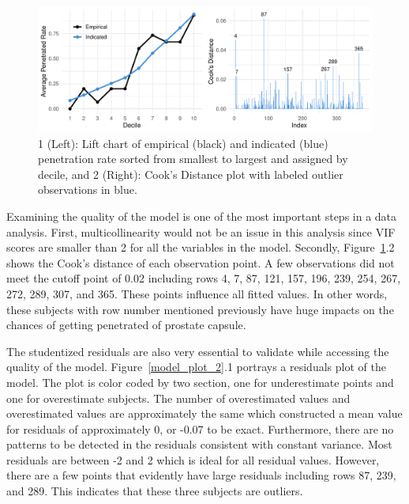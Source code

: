 \documentclass[11pt]{article}\usepackage[]{graphicx}\usepackage[]{color}
\makeatletter
\def\maxwidth{ %
  \ifdim\Gin@nat@width>\linewidth
    \linewidth
  \else
    \Gin@nat@width
  \fi
}
\makeatother
\begin{document}
\begin{figure}[h!] 
\begin{center}

\includegraphics[width=\maxwidth]{figure/unnamed-chunk-4-1} 

\caption{1 (Left): Lift chart of empirical (black) and indicated (blue) penetration rate sorted from smallest to largest and assigned by decile, and 2 (Right): Cook's Distance plot with labeled outlier observations in blue.}
\label{model_plot_1}
\end{center} 
\end{figure}

\noindent Examining the quality of the model is one of the most important steps in a data analysis. First, multicollinearity would not be an issue in this analysis since VIF scores are smaller than 2 for all the variables in the model. Secondly, Figure~\ref{model_plot_1}.2 shows the Cook's distance of each observation point. A few observations did not meet the cutoff point of 0.02 including rows 4, 7, 87, 121, 157, 196, 239, 254, 267, 272, 289, 307, and 365. These points influence all fitted values. In other words, these subjects with row number mentioned previously have huge impacts on the chances of getting penetrated of prostate capsule.    
\hfill \break

\noindent The studentized residuals are also very essential to validate while accessing the quality of the model. Figure~\ref{model_plot_2}.1 portrays a residuals plot of the model. The plot is color coded by two section, one for underestimate points and one for overestimate subjects. The number of overestimated values and overestimated values are approximately the same which constructed a mean value for residuals of approximately 0, or -0.07 to be exact. Furthermore, there are no patterns to be detected in the residuals consistent with constant variance. Most residuals are between -2 and 2 which is ideal for all residual values. However, there are a few points that evidently have large residuals including rows 87, 239, and 289. This indicates that these three subjects are outliers.        
\end{document}
